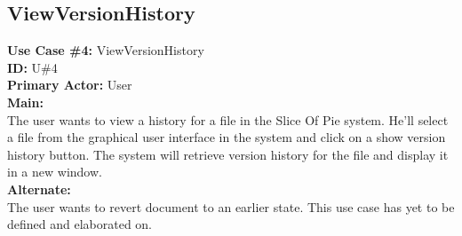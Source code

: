 \subsection{ViewVersionHistory}
\textbf{Use Case \#4:} ViewVersionHistory\\
\textbf{ID:} U\#4\\
\newline
\textbf{Primary Actor:} User\\
\textbf{Main:}\\
The user wants to view a history for a file in the Slice Of Pie system. He’ll select a file from the graphical user interface in the system and click on a show version history button. The system will retrieve version history for the file and display it in a new window. \\
\textbf{Alternate:}\\
The user wants to revert document to an earlier state. This use case has yet to be defined and elaborated on.\\
\newpage